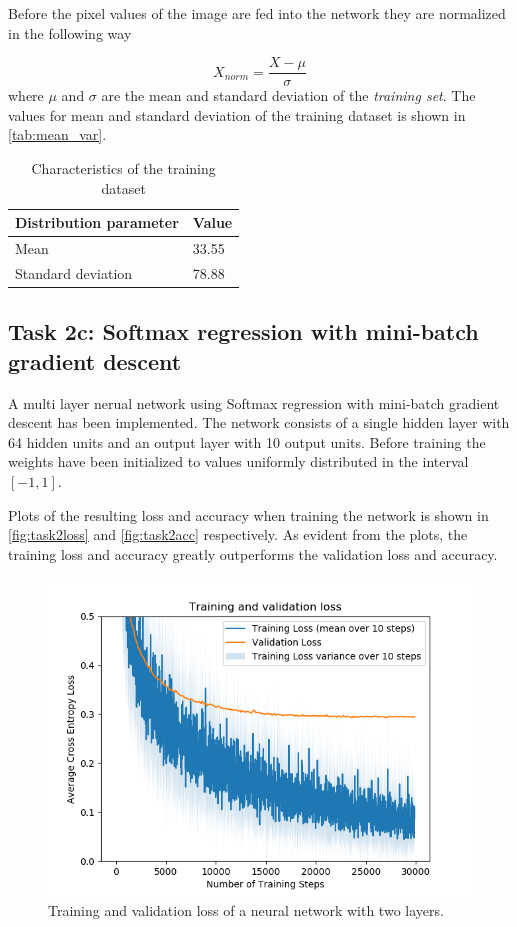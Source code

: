 \documentclass{article}
\begin{document}
 Before the pixel values of the image are fed into the network they are normalized in the following way

 \begin{equation}
     X_{norm} = \frac{X - \mu}{\sigma}
 \end{equation}
 where $\mu$ and $\sigma$ are the mean and standard deviation of the \textit{training set}. The values for mean and standard deviation of the training dataset is shown in \autoref{tab:mean_var}. 
 
 \begin{table}[H]
 \centering
 \caption{Characteristics of the training dataset}
 \label{tab:mean_var}
 \begin{tabular}{|l|l|}
 \hline
 \textbf{Distribution parameter} & \textbf{Value} \\ \hline
 Mean                            & 33.55          \\ \hline
 Standard deviation              & 78.88          \\ \hline
 \end{tabular}
 \end{table}
 
\subsection{Task 2c: Softmax regression with mini-batch gradient descent}
A multi layer nerual network using Softmax regression with mini-batch gradient descent has been implemented. The network consists of a single hidden layer with 64 hidden units and an output layer with 10 output units. Before training the weights have been initialized to values uniformly distributed in the interval $[-1,1]$.

Plots of the resulting loss and accuracy when training the network is shown in \autoref{fig:task2loss} and \autoref{fig:task2acc} respectively. As evident from the plots, the training loss and accuracy greatly outperforms the validation loss and accuracy.

\begin{figure}[H]
    \centering
    \includegraphics[width=\textwidth]{Assignments/Assignment_2/plots/task2abc/2c_loss.png}
    \caption{Training and validation loss of a neural network with two layers.}
    \label{fig:task2loss}
\end{figure}
\end{document}
